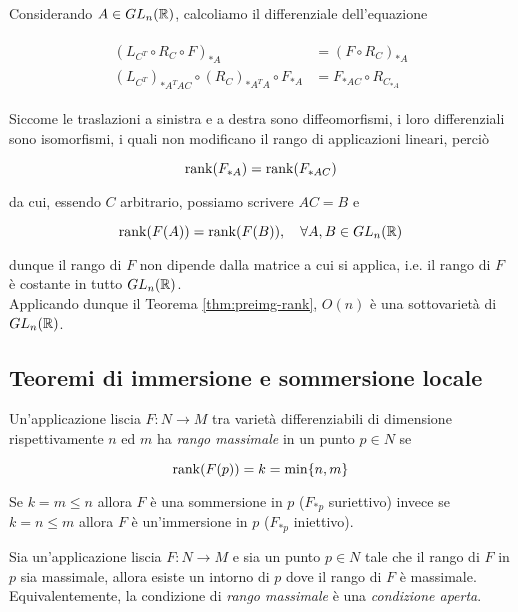 Considerando $ A \in GL_{n}(\mathbb{R}) $, calcoliamo il differenziale dell'equazione

\begin{align}
	\begin{split}
		(L_{C^{T}} \circ R_{C} \circ F)_{*A} &= (F \circ R_{C})_{*A} \\
		(L_{C^{T}})_{*A^{T} A C} \circ (R_{C})_{*A^{T} A} \circ F_{*A} &= F_{*A C} \circ R_{C_{*A}}
	\end{split}
\end{align}

Siccome le traslazioni a sinistra e a destra sono diffeomorfismi, i loro differenziali sono isomorfismi, i quali non modificano il rango di applicazioni lineari, perciò

\begin{equation}
	\rank(F_{*A}) = \rank(F_{*A C})
\end{equation}

da cui, essendo $ C $ arbitrario, possiamo scrivere $ A C = B $ e

\begin{equation}
	\rank(F(A)) = \rank(F(B)) \qcomma \forall A,B \in GL_{n}(\R)
\end{equation}

dunque il rango di $ F $ non dipende dalla matrice a cui si applica, i.e. il rango di $ F $ è costante in tutto $ GL_{n}(\mathbb{R}) $. \\
Applicando dunque il Teorema \ref{thm:preimg-rank}, $ O(n) $ è una sottovarietà di $ GL_{n}(\mathbb{R}) $.

\subsection{Teoremi di immersione e sommersione locale}

Un'applicazione liscia $ F : N \to M $ tra varietà differenziabili di dimensione rispettivamente $ n $ ed $ m $ ha \textit{rango massimale} in un punto $ p \in N $ se

\begin{equation}
	\rank(F(p)) = k = \min\{n,m\}
\end{equation}

Se $ k = m \leqslant n $ allora $ F $ è una sommersione in $ p $ ($ F_{*p} $ suriettivo) invece se $ k = n \leqslant m $ allora $ F $ è un'immersione in $ p $ ($ F_{*p} $ iniettivo).

\begin{lemma}
	Sia un'applicazione liscia $ F : N \to M $ e sia un punto $ p \in N $ tale che il rango di $ F $ in $ p $ sia massimale, allora esiste un intorno di $ p $ dove il rango di $ F $ è massimale. \\
	Equivalentemente, la condizione di \textit{rango massimale} è una \textit{condizione aperta}.
\end{lemma}

